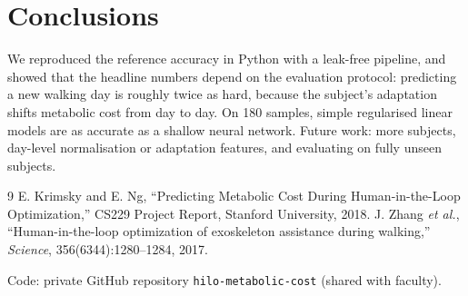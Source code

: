 \documentclass[10pt,twocolumn]{article}
\begin{document}
\section{Conclusions}
We reproduced the reference accuracy in Python with a leak-free pipeline, and showed that the
headline numbers depend on the evaluation protocol: predicting a new walking day is roughly twice
as hard, because the subject's adaptation shifts metabolic cost from day to day. On 180 samples,
simple regularised linear models are as accurate as a shallow neural network. Future work: more
subjects, day-level normalisation or adaptation features, and evaluating on fully unseen subjects.

\begin{thebibliography}{9}\small
{} E. Krimsky and E. Ng, ``Predicting Metabolic Cost During Human-in-the-Loop
Optimization,'' CS229 Project Report, Stanford University, 2018.
 J. Zhang \emph{et al.}, ``Human-in-the-loop optimization of exoskeleton
assistance during walking,'' \emph{Science}, 356(6344):1280--1284, 2017.
\end{thebibliography}

\noindent\small Code: private GitHub repository \texttt{hilo-metabolic-cost} (shared with faculty).
\end{document}
